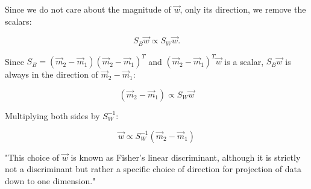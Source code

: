 \documentclass[12pt]{article}
\begin{document}
	Since we do not care about the magnitude of $\vec{w}$, only its direction, we remove the scalars:
	
	$$S_{B} \vec{w} \propto S_{W} \vec{w}.$$
	
	Since $S_B = (\vec{m}_2 - \vec{m}_1)(\vec{m}_2 - \vec{m}_1)^T$ and $(\vec{m}_2 - \vec{m}_1)^T \vec{w}$ is a scalar, $S_B \vec{w}$ is always in the direction of $\vec{m}_2-\vec{m}_1$:
	
	$$(\vec{m}_2 - \vec{m}_1)\propto S_{W} \vec{w}$$
	
	Multiplying both sides by $S_W^{-1}$:
	
	$$\vec{w} \propto S_{W}^{-1}(\vec{m}_2 - \vec{m}_1)$$
	
	"This choice of $\vec{w}$ is known as Fisher’s linear discriminant, although it is strictly not a discriminant but rather a specific choice of direction for projection of data down to one dimension." 

	
\end{document}
